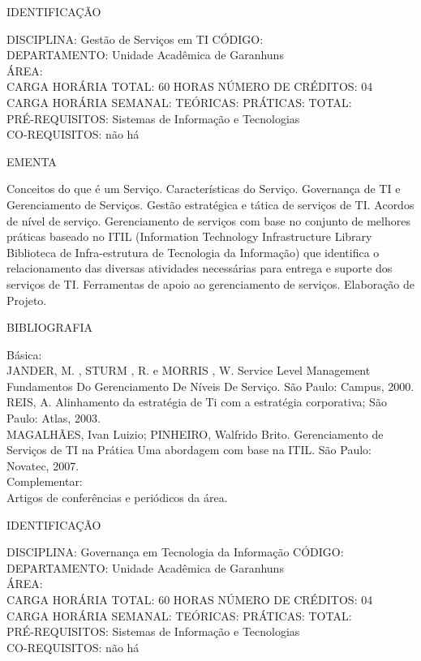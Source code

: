 \documentclass[
	12pt,				%
	openright,			%
  oneside,     %
	a4paper,			%
	english,			%
	french,				%
	spanish,			%
	brazil				%
	]{abntex2}
\begin{document}
\begin{apendicesenv}
\newpage IDENTIFICAÇÃO

DISCIPLINA: Gestão de Serviços em TI CÓDIGO:\\ 
DEPARTAMENTO: Unidade Acadêmica de Garanhuns\\
ÁREA: \\
CARGA HORÁRIA TOTAL: 60 HORAS NÚMERO DE CRÉDITOS: 04\\
CARGA HORÁRIA SEMANAL: TEÓRICAS: PRÁTICAS: TOTAL: \\
PRÉ-REQUISITOS: Sistemas de Informação e Tecnologias\\
CO-REQUISITOS: não há

EMENTA 

Conceitos do que é um Serviço. Características do Serviço. Governança de
TI e Gerenciamento de Serviços. Gestão estratégica e tática de serviços
de TI. Acordos de nível de serviço. Gerenciamento de serviços com base
no conjunto de melhores práticas baseado no ITIL (Information
Technology Infrastructure Library Biblioteca de Infra-estrutura de
Tecnologia da Informação) que identifica o relacionamento das diversas
atividades necessárias para entrega e suporte dos serviços de TI.
Ferramentas de apoio ao gerenciamento de serviços. Elaboração de
Projeto.

BIBLIOGRAFIA 

Básica:\\
JANDER, M. , STURM , R. e MORRIS , W. Service Level Management 
Fundamentos Do Gerenciamento De Níveis De Serviço. São Paulo: Campus,
2000.\\
REIS, A. Alinhamento da estratégia de Ti com a estratégia corporativa;
São Paulo: Atlas, 2003.\\
MAGALHÃES, Ivan Luizio; PINHEIRO, Walfrido Brito. Gerenciamento de
Serviços de TI na Prática  Uma abordagem com base na ITIL. São
Paulo: Novatec, 2007.\\
Complementar:\\
Artigos de conferências e periódicos da área.

\newpage IDENTIFICAÇÃO

DISCIPLINA: Governança em Tecnologia da Informação CÓDIGO:\\ 
DEPARTAMENTO: Unidade Acadêmica de Garanhuns\\ 
ÁREA: \\
CARGA HORÁRIA TOTAL: 60 HORAS NÚMERO DE CRÉDITOS: 04\\
CARGA HORÁRIA SEMANAL: TEÓRICAS: PRÁTICAS: TOTAL: \\
PRÉ-REQUISITOS: Sistemas de Informação e Tecnologias\\
CO-REQUISITOS: não há


\end{apendicesenv}
\end{document}
